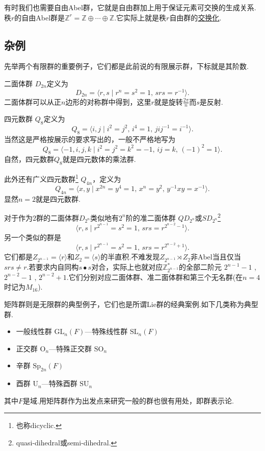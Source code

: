 \begin{remark}
	有时我们也需要{\heiti 自由Abel群}，它就是自由群加上用于保证元素可交换的生成关系.秩$r$的自由Abel群是$\mathbb{Z}^{r}=\mathbb{Z}\oplus\cdots\oplus\mathbb{Z}$.它实际上就是秩$r$自由群的\hyperlink{text:Abelianization}{交换化}.
\end{remark}

\subsection{杂例}
先举两个有限群的重要例子，它们都是此前说的有限展示群，下标就是其阶数.

{\heiti 二面体群} $D_{2n}$定义为
\[
	D_{2n}=\langle r,s\mid r^n=s^2=1,\,srs=r^{-1}\rangle .
\]
二面体群可以从正$n$边形的对称群中得到，这里$r$就是旋转$\frac{2\pi}{n}$而$s$是反射.

{\heiti 四元数群} $Q_8$定义为
\[
	Q_8=\langle i,j\mid i^2=j^2,\,i^4=1,\,jij^{-1}=i^{-1}\rangle .
\]
当然这是严格按展示的要求写出的，一般不严格地写为
\[
	Q_8=\langle -1,i,j,k\mid i^2=j^2=k^2=-1,\,ij=k,\,(-1)^2=1\rangle .
\]
自然，四元数群$Q_8$就是四元数体的乘法群.
\begin{remark}
	此外还有{\heiti 广义四元数群}\footnote{也称dicyclic.} $Q_{4n}$，定义为
	\[
		Q_{4n}=\langle x,y\mid x^{2n}=y^4=1,\,x^n=y^2,\,y^{-1}xy=x^{-1}\rangle .
	\]
	显然$n=2$就是四元数群.

	对于作为$2$群的二面体群$D_{2^n}$类似地有$2^n$阶的{\heiti 准二面体群} $QD_{2^n}$或$SD_{2^n}$\footnote{quasi-dihedral或semi-dihedral.}
	\[
		\langle r,s\mid r^{2^{n-1}}=s^2=1,\,srs=r^{2^{n-2}-1}\rangle .
	\]
	另一个类似的群是
	\[
		\langle r,s\mid r^{2^{n-1}}=s^2=1,\,srs=r^{2^{n-2}+1}\rangle .
	\]
	它们都是$Z_{2^{n-1}}=\langle r\rangle $和$Z_2=\langle s\rangle $的半直积.不难发现$Z_{2^{n-1}}\rtimes Z_2$非Abel当且仅当$srs\ne r$.若要求内自同构$s\bullet s$对合，实际上也就对应$\mathbb{Z}_{2^{n-1}}^*$的全部二阶元 $2^{n-1}-1$ , $2^{n-2}-1$ , $2^{n-2}+1$.它们分别对应二面体群、准二面体群和第三个无名群(在$n=4$时记为$M_{16}$).
\end{remark}

{\heiti 矩阵群}则是无限群的典型例子，它们也是所谓Lie群的经典案例.如下几类称为{\heiti 典型群}.
\begin{itemize}
	\item {\heiti 一般线性群} $\mathrm{GL}_n(F)$\quad ---{\heiti 特殊线性群} $\mathrm{SL}_n(F)$
	\item {\heiti 正交群} $\mathrm{O}_n$\quad ---{\heiti 特殊正交群} $\mathrm{SO}_n$
	\item {\heiti 辛群} $\mathrm{Sp}_{2n}(F)$
	\item {\heiti 酉群} $\mathrm{U}_n$\quad ---{\heiti 特殊酉群} $\mathrm{SU}_n$
\end{itemize}
其中$F$是域.用矩阵群作为出发点来研究一般的群也很有用处，即群表示论.

